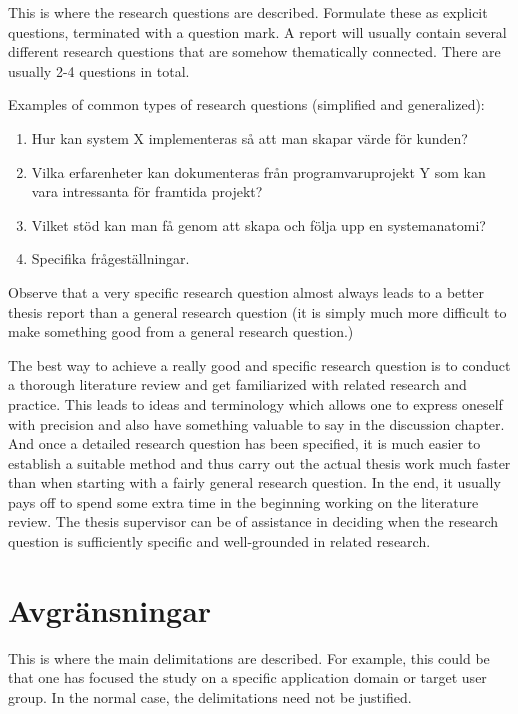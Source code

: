 This is where the research questions are described.
Formulate these as explicit questions, terminated with a
question mark. A report will usually contain several different
research questions that are somehow thematically connected.
There are usually 2-4 questions in total.

Examples of common types of research questions (simplified
and generalized):

\begin{enumerate}
\item Hur kan system X implementeras så att man skapar värde för kunden?

\item Vilka erfarenheter kan dokumenteras från programvaruprojekt Y som kan vara intressanta för framtida projekt?

\item Vilket stöd kan man få genom att skapa och följa upp en systemanatomi?

\item Specifika frågeställningar.

\end{enumerate}


Observe that a very specific research question almost always
leads to a better thesis report than a general research question
(it is simply much more difficult to make something good
from a general research question.)

The best way to achieve a really good and specific research
question is to conduct a thorough literature review and get
familiarized with related research and practice. This leads to
ideas and terminology which allows one to express oneself
with precision and also have something valuable to say in the
discussion chapter. And once a detailed research question
has been specified, it is much easier to establish a suitable
method and thus carry out the actual thesis work much faster
than when starting with a fairly general research question. In
the end, it usually pays off to spend some extra time in the
beginning working on the literature review. The thesis
supervisor can be of assistance in deciding when the research
question is sufficiently specific and well-grounded in related
research.

\section{Avgränsningar}
\label{sec:delimitations}

This is where the main delimitations are described. For
example, this could be that one has focused the study on a
specific application domain or target user group. In the
normal case, the delimitations need not be justified.


